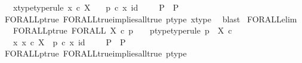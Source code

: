 \begin{isabellebody}
\ \ \ x{\isacharunderscore}{\kern0pt}type{\isacharbrackleft}{\kern0pt}type{\isacharunderscore}{\kern0pt}rule{\isacharbrackright}{\kern0pt}{\isacharcolon}{\kern0pt}\ {\isachardoublequoteopen}x\ {\isasymin}\isactrlsub c\ X{\isachardoublequoteclose}\isanewline
\ \ \ {\isachardoublequoteopen}{\isacharparenleft}{\kern0pt}p\ {\isasymcirc}\isactrlsub c\ {\isasymlangle}x{\isacharcomma}{\kern0pt}\ id\ {\isasymone}{\isasymrangle}\ {\isacharequal}{\kern0pt}\ {\isasymt}\ {\isasymLongrightarrow}\ P{\isacharparenright}{\kern0pt}\ {\isasymLongrightarrow}\ P{\isachardoublequoteclose}\isanewline
%
\isadelimproof
\ \ %
\endisadelimproof
%
\isatagproof
{}\isamarkupfalse%
\ FORALL{\isacharunderscore}{\kern0pt}p{\isacharunderscore}{\kern0pt}true\ FORALL{\isacharunderscore}{\kern0pt}true{\isacharunderscore}{\kern0pt}implies{\isacharunderscore}{\kern0pt}all{\isacharunderscore}{\kern0pt}true{}\ p{\isacharunderscore}{\kern0pt}type\ x{\isacharunderscore}{\kern0pt}type\ \isamarkupfalse%
\ blast%
\endisatagproof
{\isafoldproof}%
%
\isadelimproof
\isanewline
%
\endisadelimproof
\isanewline
{}\isamarkupfalse%
\ FORALL{\isacharunderscore}{\kern0pt}elim{\isacharprime}{\kern0pt}{\isacharcolon}{\kern0pt}\isanewline
\ \ \ FORALL{\isacharunderscore}{\kern0pt}p{\isacharunderscore}{\kern0pt}true{\isacharcolon}{\kern0pt}\ {\isachardoublequoteopen}FORALL\ X\ {\isasymcirc}\isactrlsub c\ p\isactrlsup {\isasymsharp}\ {\isacharequal}{\kern0pt}\ {\isasymt}{\isachardoublequoteclose}\ \ p{\isacharunderscore}{\kern0pt}type{\isacharbrackleft}{\kern0pt}type{\isacharunderscore}{\kern0pt}rule{\isacharbrackright}{\kern0pt}{\isacharcolon}{\kern0pt}\ {\isachardoublequoteopen}p\ {\isacharcolon}{\kern0pt}\ X\ {\isasymtimes}\isactrlsub c\ {\isasymone}\ {\isasymrightarrow}\ {\isasymOmega}{\isachardoublequoteclose}\isanewline
\ \ \ {\isachardoublequoteopen}{\isacharparenleft}{\kern0pt}{\isacharparenleft}{\kern0pt}{\isasymAnd}x{\isachardot}{\kern0pt}\ x\ {\isasymin}\isactrlsub c\ X\ {\isasymLongrightarrow}\ p\ {\isasymcirc}\isactrlsub c\ {\isasymlangle}x{\isacharcomma}{\kern0pt}\ id\ {\isasymone}{\isasymrangle}\ {\isacharequal}{\kern0pt}\ {\isasymt}{\isacharparenright}{\kern0pt}\ {\isasymLongrightarrow}\ P{\isacharparenright}{\kern0pt}\ {\isasymLongrightarrow}\ P{\isachardoublequoteclose}\isanewline
%
\isadelimproof
\ \ %
\endisadelimproof
%
\isatagproof
{}\isamarkupfalse%
\ FORALL{\isacharunderscore}{\kern0pt}p{\isacharunderscore}{\kern0pt}true\ FORALL{\isacharunderscore}{\kern0pt}true{\isacharunderscore}{\kern0pt}implies{\isacharunderscore}{\kern0pt}all{\isacharunderscore}{\kern0pt}true{}\ p{\isacharunderscore}{\kern0pt}type\ \isamarkupfalse%

\end{isabellebody}
